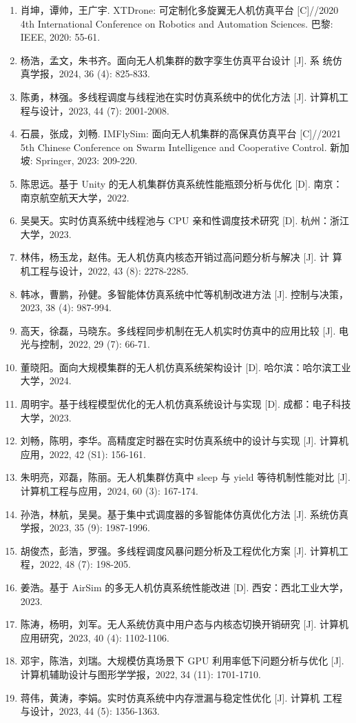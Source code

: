 \begin{enumerate}
\item 肖坤，谭帅，王广宇. XTDrone: 可定制化多旋翼无人机仿真平台 {[}C{]}//2020 4th International Conference on Robotics and Automation Sciences. 巴黎: IEEE, 2020: 55-61.
\item 杨浩，孟文，朱书齐。面向无人机集群的数字孪生仿真平台设计 {[}J{]}. 系 统仿真学报，2024, 36 (4): 825-833.
\item 陈勇，林强。多线程调度与线程池在实时仿真系统中的优化方法 {[}J{]}. 计算机工程与设计，2023, 44 (7): 2001-2008.
\item 石晨，张成，刘畅. IMFlySim: 面向无人机集群的高保真仿真平台 {[}C{]}//2021 5th Chinese Conference on Swarm Intelligence and Cooperative Control. 新加坡: Springer, 2023: 209-220.
\item 陈思远。基于 Unity 的无人机集群仿真系统性能瓶颈分析与优化 {[}D{]}. 南京：南京航空航天大学，2022.
\item 吴昊天。实时仿真系统中线程池与 CPU 亲和性调度技术研究 {[}D{]}. 杭州：浙江大学，2023.
\item 林伟，杨玉龙，赵伟。无人机仿真内核态开销过高问题分析与解决 {[}J{]}. 计 算机工程与设计，2022, 43 (8): 2278-2285.
\item 韩冰，曹鹏，孙健。多智能体仿真系统中忙等机制改进方法 {[}J{]}. 控制与决策，2023, 38 (4): 987-994.
\item 高天，徐磊，马晓东。多线程同步机制在无人机实时仿真中的应用比较 {[}J{]}. 电光与控制，2022, 29 (7): 66-71.
\item 董晓阳。面向大规模集群的无人机仿真系统架构设计 {[}D{]}. 哈尔滨：哈尔滨工业大学，2024.
\item 周明宇。基于线程模型优化的无人机仿真系统设计与实现 {[}D{]}. 成都：电子科技大学，2023.
\item 刘畅，陈明，李华。高精度定时器在实时仿真系统中的设计与实现 {[}J{]}. 计算机应用，2022, 42 (S1): 156-161.
\item 朱明亮，邓磊，陈丽。无人机集群仿真中 sleep 与 yield 等待机制性能对比 {[}J{]}. 计算机工程与应用，2024, 60 (3): 167-174.
\item 孙浩，林航，吴昊。基于集中式调度器的多智能体仿真优化方法 {[}J{]}. 系统仿真学报，2023, 35 (9): 1987-1996.
\item 胡俊杰，彭浩，罗强。多线程调度风暴问题分析及工程优化方案 {[}J{]}. 计算机工程，2022, 48 (7): 198-205.
\item 姜浩。基于 AirSim 的多无人机仿真系统性能改进 {[}D{]}. 西安：西北工业大学，2023.
\item 陈涛，杨明，刘军。无人系统仿真中用户态与内核态切换开销研究 {[}J{]}. 计算机应用研究，2023, 40 (4): 1102-1106.
\item 邓宇，陈浩，刘瑞。大规模仿真场景下 GPU 利用率低下问题分析与优化 {[}J{]}. 计算机辅助设计与图形学学报，2022, 34 (11): 1701-1710.
\item 蒋伟，黄涛，李娟。实时仿真系统中内存泄漏与稳定性优化 {[}J{]}. 计算机 工程与设计，2023, 44 (5): 1356-1363.
\end{enumerate}
\endgroup
